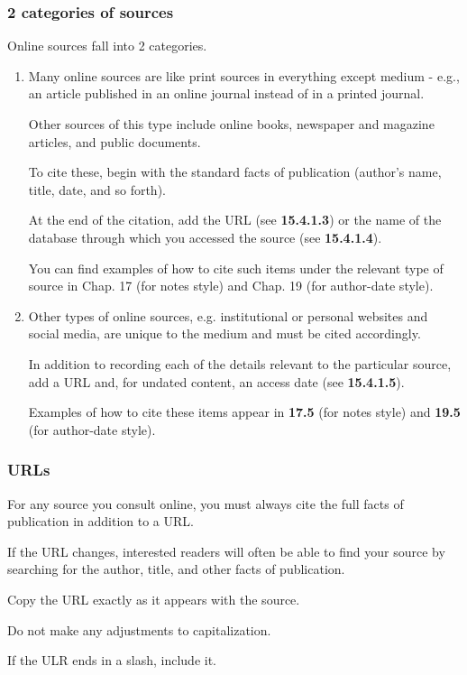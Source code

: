 \documentclass[oneside]{book}
\numberwithin{equation}{section}
\begin{document}
\subsubsection{2 categories of sources}
Online sources fall into 2 categories.
\begin{enumerate}
    \item Many online sources are like print sources in everything except medium - e.g., an article published in an online journal instead of in a printed journal.
    
    Other sources of this type include online books, newspaper and magazine articles, and public documents.
    
    To cite these, begin with the standard facts of publication (author's name, title, date, and so forth).
    
    At the end of the citation, add the URL (see \textbf{15.4.1.3}) or the name of the database through which you accessed the source (see \textbf{15.4.1.4}).
    
    You can find examples of how to cite such items under the relevant type of source in Chap. 17 (for notes style) and Chap. 19 (for author-date style).
    \item Other types of online sources, e.g. institutional or personal websites and social media, are unique to the medium and must be cited accordingly.
    
    In addition to recording each of the details relevant to the particular source, add a URL and, for undated content, an access date (see \textbf{15.4.1.5}).
    
    Examples of how to cite these items appear in \textbf{17.5} (for notes style) and \textbf{19.5} (for author-date style).
\end{enumerate}

\subsubsection{URLs}
For any source you consult online, you must always cite the full facts of publication in addition to a URL.

If the URL changes, interested readers will often be able to find your source by searching for the author, title, and other facts of publication.

%
Copy the URL exactly as it appears with the source.

Do not make any adjustments to capitalization.

If the ULR ends in a slash, include it.
\end{document}
